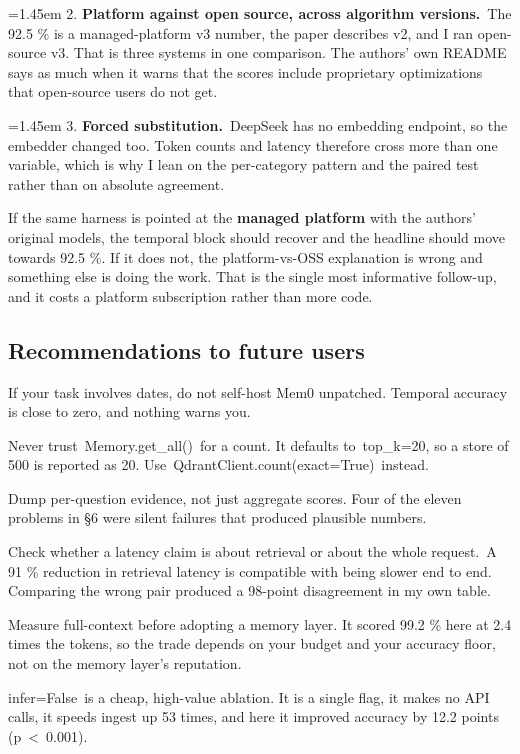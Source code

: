 \documentclass[11pt,a4paper]{article}
\begin{document}
\noindent\hangindent=1.45em 2. \textbf{Platform against open source, across algorithm versions.}~The 92.5 \% is a managed-platform v3 number, the paper describes v2, and I ran open-source v3. That is three systems in one comparison. The authors' own README says as much when it warns that the scores include proprietary optimizations that open-source users do not get.

\noindent\hangindent=1.45em 3. \textbf{Forced substitution.}~DeepSeek has no embedding endpoint, so the embedder changed too. Token counts and latency therefore cross more than one variable, which is why I lean on the per-category pattern and the paired test rather than on absolute agreement.

If the same harness is pointed at the \textbf{managed platform} with the authors' original models, the temporal block should recover and the headline should move towards 92.5 \%. If it does not, the platform-vs-OSS explanation is wrong and something else is doing the work. That is the single most informative follow-up, and it costs a platform subscription rather than more code.

\subsection{Recommendations to future users}

If your task involves dates, do not self-host Mem0 unpatched. Temporal accuracy is close to zero, and nothing warns you.

Never trust~Memory.get\_all()~for a count. It defaults to~top\_k=20, so a store of 500 is reported as 20. Use~QdrantClient.count(exact=True)~instead.

Dump per-question evidence, not just aggregate scores. Four of the eleven problems in §6 were silent failures that produced plausible numbers.

Check whether a latency claim is about retrieval or about the whole request.~A 91 \% reduction in retrieval latency is compatible with being slower end to end. Comparing the wrong pair produced a 98-point disagreement in my own table.

Measure full-context before adopting a memory layer. It scored 99.2 \% here at 2.4 times the tokens, so the trade depends on your budget and your accuracy floor, not on the memory layer's reputation.

infer=False~is a cheap, high-value ablation. It is a single flag, it makes no API calls, it speeds ingest up 53 times, and here it improved accuracy by 12.2 points (p~<~0.001).
\end{document}
